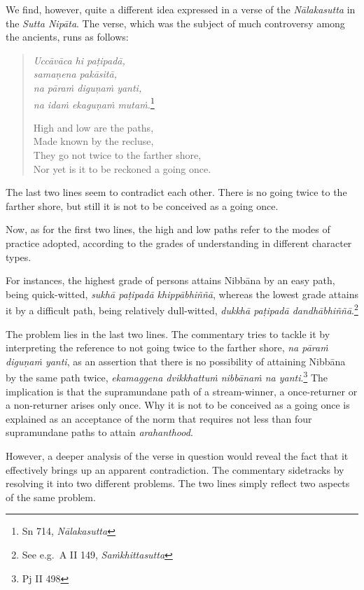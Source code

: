 We find, however, quite a different idea expressed in a verse of the \emph{Nālakasutta} in the \emph{Sutta Nipāta}. The verse, which was the subject of much controversy among the ancients, runs as follows:

\begin{quote}
\emph{Uccāvāca hi paṭipadā,}\\
\emph{samaṇena pakāsitā,}\\
\emph{na pāraṁ diguṇaṁ yanti,}\\
\emph{na idaṁ ekaguṇaṁ mutaṁ.}\footnote{Sn 714, \emph{Nālakasutta}}

High and low are the paths,\\
Made known by the recluse,\\
They go not twice to the farther shore,\\
Nor yet is it to be reckoned a going once.
\end{quote}

The last two lines seem to contradict each other. There is no going twice to the farther shore, but still it is not to be conceived as a going once.

Now, as for the first two lines, the high and low paths refer to the modes of practice adopted, according to the grades of understanding in different character types.

For instances, the highest grade of persons attains Nibbāna by an easy path, being quick-witted, \emph{sukhā paṭipadā khippābhiññā}, whereas the lowest grade attains it by a difficult path, being relatively dull-witted, \emph{dukkhā paṭipadā dandhābhiññā}.\footnote{See e.g.~A II 149, \emph{Saṁkhittasutta}}

The problem lies in the last two lines. The commentary tries to tackle it by interpreting the reference to not going twice to the farther shore, \emph{na pāraṁ diguṇaṁ yanti}, as an assertion that there is no possibility of attaining Nibbāna by the same path twice, \emph{ekamaggena dvikkhattuṁ nibbānaṁ na yanti}.\footnote{Pj II 498} The implication is that the supramundane path of a stream-winner, a once-returner or a non-returner arises only once. Why it is not to be conceived as a going once is explained as an acceptance of the norm that requires not less than four supramundane paths to attain \emph{arahanthood}.

However, a deeper analysis of the verse in question would reveal the fact that it effectively brings up an apparent contradiction. The commentary sidetracks by resolving it into two different problems. The two lines simply reflect two aspects of the same problem.

